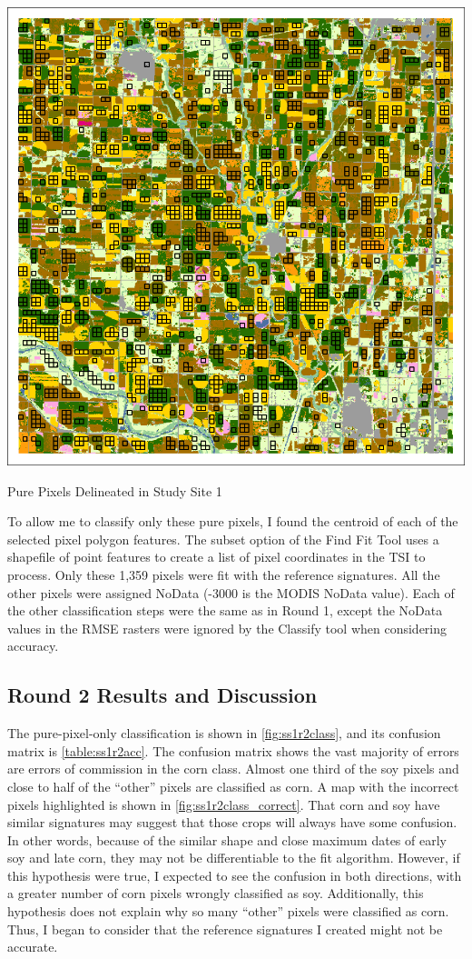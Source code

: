 \begin{ssfigure}
  \centering
  \includegraphics[width=.9\textwidth]{Graphics/Testing/clip1_30mCDL_pure_pixels.pdf}
  \caption{Pure Pixels Delineated in Study Site 1}
  \label{fig:ss1purepx}
\end{ssfigure}

To allow me to classify only these pure pixels, I found the centroid of each of the selected pixel polygon features. The subset option of the Find Fit Tool uses a shapefile of point features to create a list of pixel coordinates in the TSI to process. Only these 1,359 pixels were fit with the reference signatures. All the other pixels were assigned NoData (-3000 is the MODIS NoData value). Each of the other classification steps were the same as in Round 1, except the NoData values in the RMSE rasters were ignored by the Classify tool when considering accuracy.


\subsection*{Round 2 Results and Discussion}

The pure-pixel-only classification is shown in \cref{fig:ss1r2class}, and its confusion matrix is \autoref{table:ss1r2acc}. The confusion matrix shows the vast majority of errors are errors of commission in the corn class. Almost one third of the soy pixels and close to half of the ``other'' pixels are classified as corn. A map with the incorrect pixels highlighted is shown in \cref{fig:ss1r2class_correct}. That corn and soy have similar signatures may suggest that those crops will always have some confusion. In other words, because of the similar shape and close maximum dates of early soy and late corn, they may not be differentiable to the fit algorithm. However, if this hypothesis were true, I expected to see the confusion in both directions, with a greater number of corn pixels wrongly classified as soy. Additionally, this hypothesis does not explain why so many ``other'' pixels were classified as corn. Thus, I began to consider that the reference signatures I created might not be accurate.


